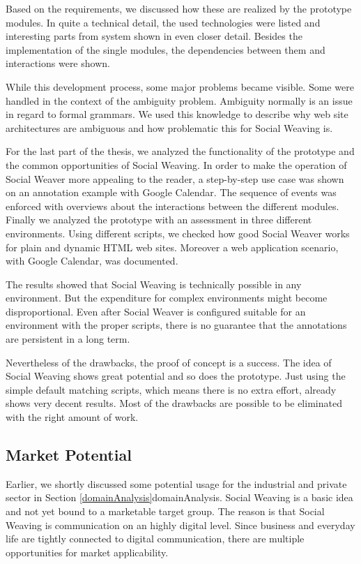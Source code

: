 Based on the requirements, we discussed how these are realized by the prototype modules. In quite a technical detail, the used technologies were listed and interesting parts from system shown in even closer detail. Besides the implementation of the single modules, the dependencies between them and interactions were shown. 

While this development process, some major problems became visible. Some were handled in the context of the ambiguity problem. Ambiguity normally is an issue in regard to formal grammars. We used this knowledge to describe why web site architectures are ambiguous and how problematic this for Social Weaving is. 

For the last part of the thesis, we analyzed the functionality of the prototype and the common opportunities of Social Weaving. In order to make the operation of Social Weaver more appealing to the reader, a step-by-step use case was shown on an annotation example with Google Calendar. The sequence of events was enforced with overviews about the interactions between the different modules. Finally we analyzed the prototype with an assessment in three different environments. Using different scripts, we checked how good Social Weaver works for plain and dynamic HTML web sites. Moreover a web application scenario, with Google Calendar, was documented. 

The results showed that Social Weaving is technically possible in any environment. But the expenditure for complex environments might become disproportional. Even after Social Weaver is configured suitable for an environment with the proper scripts, there is no guarantee that the annotations are persistent in a long term. 

Nevertheless of the drawbacks, the proof of concept is a success. The idea of Social Weaving shows great potential and so does the prototype. Just using the simple default matching scripts, which means there is no extra effort, already shows very decent results. Most of the drawbacks are possible to be eliminated with the right amount of work. 

\subsection{Market Potential}
Earlier, we shortly discussed some potential usage for the industrial and private sector in Section \ref{domainAnalysis}\refname{domainAnalysis}. Social Weaving is a basic idea and not yet bound to a marketable target group. The reason is that Social Weaving is communication on an highly digital level. Since business and everyday life are tightly connected to digital communication, there are multiple opportunities for market applicability. 

